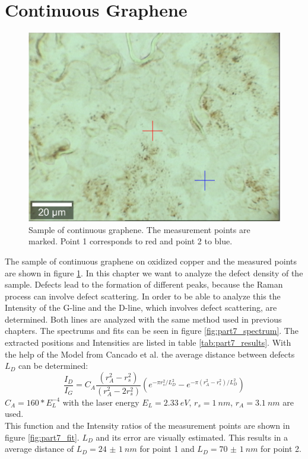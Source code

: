 \documentclass[12pt,a4paper]{article}
\begin{document}
\newpage
\section{Continuous Graphene}
\label{sec:9}

\begin{figure}[!htb]
\centering
\includegraphics[scale=0.3]{Bilder/part7/Continuousoptical.png}
\caption{Sample of continuous graphene. The measurement points are marked. Point 1 corresponds to red and point 2 to blue.}
\label{fig:part7_sample}
\end{figure}

The sample of continuous graphene on oxidized copper and the measured points are shown in figure \ref{fig:part7_sample}. In this chapter we want to analyze the defect density of the sample. Defects lead to the formation of different peaks, because the Raman process can involve defect scattering. In order to be able to analyze this the Intensity of the G-line and the D-line, which involves defect scattering, are determined. Both lines are analyzed with the same method used in previous chapters. The spectrums and fits can be seen in figure \ref{fig:part7_spectrum}. The extracted positions and Intensities are listed in table \ref{tab:part7_results}. With the help of the Model from  Cancado et al.\cite{cancado} the average distance between defects $L_D$ can be determined:
\begin{equation}
\dfrac{I_D}{I_G} = C_A \dfrac{(r_A^2 - r_s^2)}{(r_A^2 - 2 r_s^2)} (e^{-\pi r_s^2/L_D^2} -e^{-\pi (r_A^2 - r_s^2)/L_D^2})
\end{equation}
$C_A = 160 * E_L^{-4}$ with the laser energy $E_L = \SI{2.33}{eV}$, $r_s = \SI{1}{nm}$, $r_A = \SI{3.1}{nm}$ are used.\\
This function and the Intensity ratios of the measurement points are shown in figure \ref{fig:part7_fit}. $L_D$ and its error are visually estimated. This results in a average distance of $L_D = \SI{24(1)}{nm}$ for point 1 and $L_D = \SI{70(1)}{nm}$ for point 2.
\end{document}
